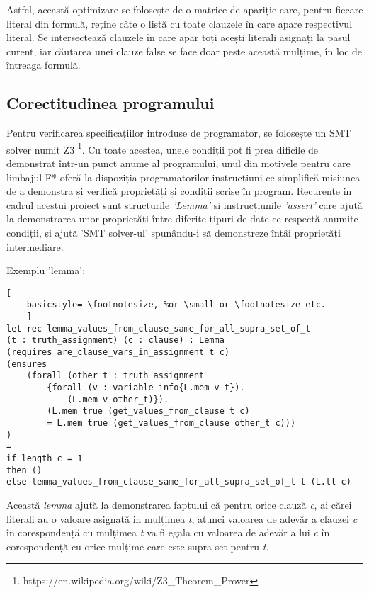 Astfel, această optimizare se folosește de o matrice de apariție care, pentru fiecare literal din formulă, reține câte o listă cu toate clauzele în care apare respectivul literal.  \newline  Se intersectează clauzele în care apar toți acești literali asignați la pasul curent, iar  \newline  căutarea unei clauze false se face doar peste această mulțime, în loc de întreaga  \newline formulă.

\subsection{Corectitudinea programului}

Pentru verificarea specificațiilor introduse de programator, se folosește un SMT solver numit Z3 \footnote{https://en.wikipedia.org/wiki/Z3\_Theorem\_Prover}.
Cu toate acestea, unele condiții pot fi prea dificile de demonstrat într-un punct anume al programului, unul din motivele pentru care limbajul F* oferă la dispoziția programatorilor instrucțiuni ce simplifică misiunea de a demonstra și \newline verifică proprietăți și condiții scrise în program. Recurente in cadrul acestui proiect sunt structurile \textit{'Lemma'} si instrucțiunile \textit{'assert'} care ajută la demonstrarea unor proprietăți între diferite tipuri de date ce respectă anumite condiții, și ajută 'SMT solver-ul' spunându-i să demonstreze întâi proprietăți intermediare.

Exemplu 'lemma':
\begin{lstlisting}[
	basicstyle= \footnotesize, %or \small or \footnotesize etc.
	]
let rec lemma_values_from_clause_same_for_all_supra_set_of_t
(t : truth_assignment) (c : clause) : Lemma
(requires are_clause_vars_in_assignment t c)
(ensures 
	(forall (other_t : truth_assignment
		{forall (v : variable_info{L.mem v t}). 
			(L.mem v other_t)}).
		(L.mem true (get_values_from_clause t c) 
		= L.mem true (get_values_from_clause other_t c)))
)
= 
if length c = 1 
then ()
else lemma_values_from_clause_same_for_all_supra_set_of_t t (L.tl c)

\end{lstlisting}

\newpage

Această \textit{lemma} ajută la demonstrarea faptului că pentru orice clauză \textit{c}, ai cărei literali au o valoare asignată in mulțimea \textit{t}, atunci valoarea de adevăr a clauzei \textit{c} în corespondență cu mulțimea \textit{t} va fi egala cu valoarea de adevăr a lui \textit{c} în corespondență cu orice mulțime care este supra-set pentru \textit{t}.

